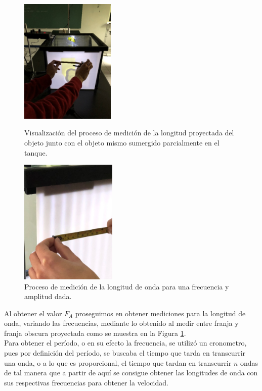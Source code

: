 \documentclass[12pt,a4paper]{article}
\begin{document}
\begin{figure}
	\begin{minipage}{0.5\linewidth}
		\centering 
		\includegraphics[height = 6cm]{IMAGENES/images/image3}
		\caption{Visualización del proceso de medición de la longitud proyectada del objeto junto con el objeto mismo sumergido parcialmente en el tanque.}
		\label{fig_3}
	\end{minipage}\hspace{8mm}
	\begin{minipage}{0.5\linewidth}
	\centering 
		\includegraphics[height = 6cm]{IMAGENES/images/image2}
		\caption{Proceso de medición de la longitud de onda para una frecuencia y amplitud dada.}
		\label{fig_4}
		\vspace{1cm}
	\end{minipage}
\end{figure}
\newpage
Al obtener el valor $F_A$ proseguimos en obtener mediciones para la longitud de onda, variando las frecuencias, mediante lo obtenido al medir entre franja y franja obscura proyectada como se muestra en la Figura \ref{fig_4}. \\[2mm]
Para obtener el período, o en su efecto la frecuencia, se utilizó un cronometro, pues por definición del período, se buscaba el tiempo que tarda en transcurrir una onda, o a lo que es proporcional, el tiempo que tardan en transcurrir $n$ ondas de tal manera que a partir de aquí se consigue obtener las longitudes de onda con sus respectivas frecuencias para obtener la velocidad.
\end{document}
